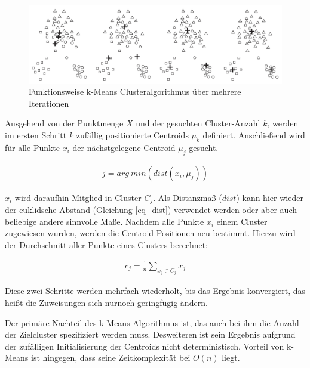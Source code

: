 \begin{figure}[H]
    \centering
    \includegraphics[width=0.9\linewidth]{resources/img/grundlagen/k-means}
    \caption[Funktionsweise k-Means Clusteralgorithmus]{Funktionsweise k-Means Clusteralgorithmus über mehrere Iterationen \cite[]{tan2007introduction}}
    \label{fig:grund_kmeans_clustering}
\end{figure}

Ausgehend von der Punktmenge $X$ und der gesuchten Cluster-Anzahl $k$,
werden im ersten Schritt $k$ zufällig positionierte Centroids $\mu_k$ definiert.
Anschließend wird für alle Punkte $x_i$ der nächstgelegene Centroid $\mu_j$ gesucht.

\begin{ceqn}
\begin{align}
    \label{eq_kmeans2}
    j = arg\ min(dist(x_i, \mu_j))
\end{align}
\end{ceqn}

$x_i$ wird daraufhin Mitglied in Cluster $C_j$. Als Distanzmaß ($dist$) kann hier wieder der euklidsche Abstand
(Gleichung \ref{eq_dist}) verwendet werden oder aber auch beliebige andere sinnvolle Maße.
Nachdem alle Punkte $x_i$ einem Cluster zugewiesen wurden, werden die Centroid Positionen neu bestimmt.
Hierzu wird der Durchschnitt aller Punkte eines Clusters berechnet:

\begin{ceqn}
\begin{align}
    \label{eq_kmeans3}
    c_j = \frac{1}{n} \sum_{x_j \in C_j} x_j
\end{align}
\end{ceqn}

Diese zwei Schritte werden mehrfach wiederholt, bis das Ergebnis konvergiert, das heißt die Zuweisungen sich
nurnoch geringfügig ändern. \cite[]{Jain2010}

Der primäre Nachteil des k-Means Algorithmus ist, das auch bei ihm die Anzahl der Zielcluster spezifiziert
werden muss. Desweiteren ist sein Ergebnis aufgrund der zufälligen Initialisierung der Centroids
nicht deterministisch. Vorteil von k-Means ist hingegen, dass seine Zeitkomplexität bei $O(n)$ liegt.

